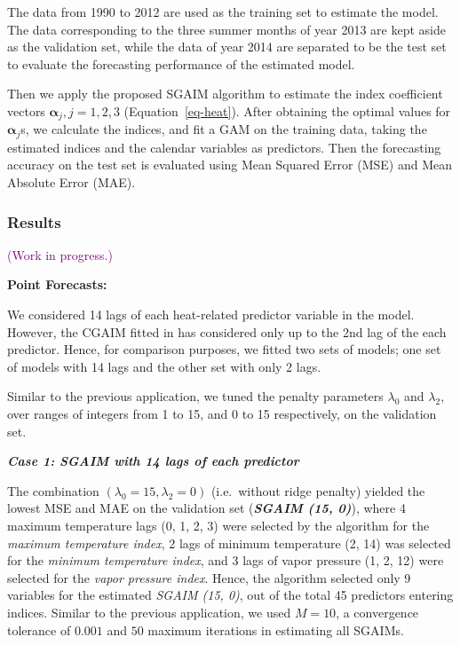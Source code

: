 \documentclass[11pt,a4paper,]{article}
\begin{document}
The data from 1990 to 2012 are used as the training set to estimate the
model. The data corresponding to the three summer months of year 2013
are kept aside as the validation set, while the data of year 2014 are
separated to be the test set to evaluate the forecasting performance of
the estimated model.

Then we apply the proposed SGAIM algorithm to estimate the index
coefficient vectors \(\bm{\alpha}_{j}, j = 1, 2, 3\)
(Equation~\ref{eq-heat}). After obtaining the optimal values for
\(\bm{\alpha}_{j}\)s, we calculate the indices, and fit a GAM on the
training data, taking the estimated indices and the calendar variables
as predictors. Then the forecasting accuracy on the test set is
evaluated using Mean Squared Error (MSE) and Mean Absolute Error (MAE).

\hypertarget{results}{%
\subsubsection{Results}\label{results}}

\textcolor{purple}{(Work in progress.)}

\textbf{Point Forecasts:}

We considered 14 lags of each heat-related predictor variable in the
model. However, the CGAIM fitted in \textcite{Masselot2022} has
considered only up to the 2nd lag of the each predictor. Hence, for
comparison purposes, we fitted two sets of models; one set of models
with 14 lags and the other set with only 2 lags.

Similar to the previous application, we tuned the penalty parameters
\(\lambda_{0}\) and \(\lambda_{2}\), over ranges of integers from 1 to
15, and 0 to 15 respectively, on the validation set.

\textbf{\emph{Case 1: SGAIM with 14 lags of each predictor}}

The combination \((\lambda_{0} = 15, \lambda_{2} = 0)\) (i.e.~without
ridge penalty) yielded the lowest MSE and MAE on the validation set
(\textbf{\emph{SGAIM (15, 0)}}), where 4 maximum temperature lags (0, 1,
2, 3) were selected by the algorithm for the \emph{maximum temperature
index}, 2 lags of minimum temperature (2, 14) was selected for the
\emph{minimum temperature index}, and 3 lags of vapor pressure (1, 2,
12) were selected for the \emph{vapor pressure index}. Hence, the
algorithm selected only 9 variables for the estimated \emph{SGAIM (15,
0)}, out of the total 45 predictors entering indices. Similar to the
previous application, we used \(M = 10\), a convergence tolerance of
\(0.001\) and \(50\) maximum iterations in estimating all SGAIMs.
\end{document}
